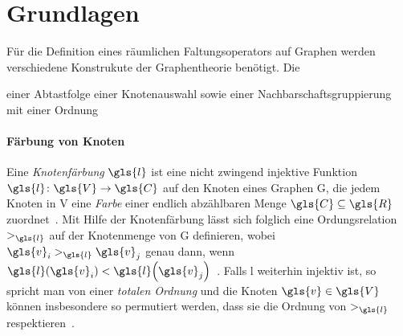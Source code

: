 \section{Grundlagen}
\label{raeumliche_grundlagen}

Für die Definition eines räumlichen Faltungsoperators auf Graphen werden verschiedene Konstrukute der Graphentheorie benötigt.
Die


einer Abtastfolge \bzw{} einer Knotenauswahl sowie einer Nachbarschaftsgruppierung mit einer Ordnung

\paragraph{Färbung von Knoten}
\label{faerbung_von_knoten}

Eine \emph{Knotenfärbung} $\gls{l}$ ist eine nicht zwingend injektive Funktion $\gls{l} \colon \gls{V} \to \gls{C}$ auf den Knoten eines Graphen \gls{G}, die jedem Knoten in \gls{V} eine \emph{Farbe} einer endlich abzählbaren Menge $\gls{C} \subseteq \gls{R}$ zuordnet~\cite{patchy}.
Mit Hilfe der Knotenfärbung lässt sich folglich eine Ordungsrelation $>_{\gls{l}}$ auf der Knotenmenge von \gls{G} definieren, wobei $\gls{v}_i >_{\gls{l}} \gls{v}_j$ genau dann, wenn $\gls{l}\left(\gls{v}_i\right) < \gls{l}\left(\gls{v}_j\right)$~\cite{patchy}.
Falls \gls{l} weiterhin injektiv ist, so spricht man von einer \emph{totalen Ordnung} und die Knoten $\gls{v} \in \gls{V}$ können insbesondere so permutiert werden, dass sie die Ordnung von $>_{\gls{l}}$ respektieren~\cite{patchy}.

